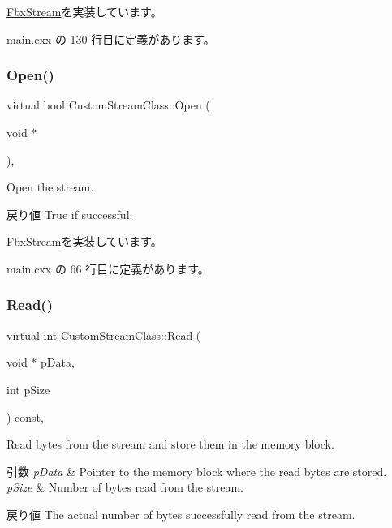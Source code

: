 \hyperlink{class_fbx_stream_af39d714bf396c28252772b5d8e7caa47}{Fbx\+Stream}を実装しています。



 main.\+cxx の 130 行目に定義があります。

\mbox{\label{class_custom_stream_class_ade734834eb279b5b3fde05b6fb3cb352}} 
\subsubsection{\texorpdfstring{Open()}{Open()}}
{\footnotesize\ttfamily virtual bool Custom\+Stream\+Class\+::\+Open (\begin{DoxyParamCaption}\item[{void $\ast$}]{ }\end{DoxyParamCaption})\hspace{0.3cm}{\ttfamily [inline]}, {\ttfamily [virtual]}}

Open the stream. \begin{DoxyReturn}{戻り値}
True if successful. 
\end{DoxyReturn}


\hyperlink{class_fbx_stream_ab8b3c6e904344c1b1d74e457ae8a74e7}{Fbx\+Stream}を実装しています。



 main.\+cxx の 66 行目に定義があります。

\mbox{\label{class_custom_stream_class_a4b1260bd3c889278862f794ca9280bcb}} 
\subsubsection{\texorpdfstring{Read()}{Read()}}
{\footnotesize\ttfamily virtual int Custom\+Stream\+Class\+::\+Read (\begin{DoxyParamCaption}\item[{void $\ast$}]{p\+Data,  }\item[{int}]{p\+Size }\end{DoxyParamCaption}) const\hspace{0.3cm}{\ttfamily [inline]}, {\ttfamily [virtual]}}

Read bytes from the stream and store them in the memory block. 
\begin{DoxyParams}{引数}
{\em p\+Data} & Pointer to the memory block where the read bytes are stored. \\
\hline
{\em p\+Size} & Number of bytes read from the stream. \\
\hline
\end{DoxyParams}
\begin{DoxyReturn}{戻り値}
The actual number of bytes successfully read from the stream. 
\end{DoxyReturn}


